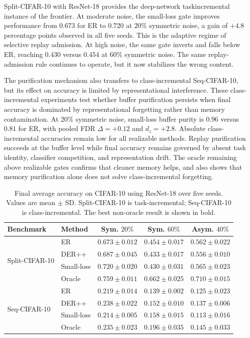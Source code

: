 \documentclass[preprint,12pt]{elsarticle}
\begin{document}
Split-CIFAR-10 with ResNet-18 provides the deep-network task\-in\-cre\-men\-tal instance of the frontier. At moderate noise, the small-loss gate improves performance from $0.673$ for ER to $0.720$ at $20\%$ symmetric noise, a gain of $+4.8$ percentage points observed in all five seeds. This is the adaptive regime of selective replay admission. At high noise, the same gate inverts and falls below ER, reaching $0.430$ versus $0.454$ at $60\%$ symmetric noise. The same replay-admission rule continues to operate, but it now stabilizes the wrong content.

The purification mechanism also transfers to class-incremental Seq-CIFAR-10, but its effect on accuracy is limited by representational interference. These class-incremental experiments test whether buffer purification persists when final accuracy is dominated by representational forgetting rather than memory contamination. At $20\%$ symmetric noise, small-loss buffer purity is $0.96$ versus $0.81$ for ER, with pooled FDR $\Delta=+0.12$ and $d_z=+2.8$. Absolute class-incremental accuracies remain low for all realizable methods. Replay purification succeeds at the buffer level while final accuracy remains governed by absent task identity, classifier competition, and representation drift. The oracle remaining above realizable gates confirms that cleaner memory helps, and also shows that memory purification alone does not solve class-incremental forgetting.

\enlargethispage{3\baselineskip}
\begin{table}[!htbp]
\centering
\caption{Final average accuracy on CIFAR-10 using ResNet-18 over five seeds. Values are mean $\pm$ SD. Split-CIFAR-10 is task-incremental; Seq-CIFAR-10 is class-incremental. The best non-oracle result is shown in bold.}
\label{tab:cifar}
\footnotesize
\setlength{\tabcolsep}{4pt} \renewcommand{\arraystretch}{0.94} \begin{tabular}{llccc}
\toprule
Benchmark & Method & Sym. $20\%$ & Sym. $60\%$ & Asym. $40\%$ \\
\midrule
\multirow{4}{*}{Split-CIFAR-10}
& ER         & $0.673\pm 0.012$ & $\mathbf{0.454\pm 0.017}$ & $0.562\pm 0.022$ \\
& DER++      & $0.687\pm 0.045$ & $0.433\pm 0.017$          & $0.556\pm 0.010$ \\
& Small-loss & $\mathbf{0.720\pm 0.020}$ & $0.430\pm 0.031$ & $\mathbf{0.565\pm 0.023}$ \\
& Oracle     & $0.759\pm 0.011$ & $0.662\pm 0.025$          & $0.710\pm 0.015$ \\
\midrule
\multirow{4}{*}{Seq-CIFAR-10}
& ER         & $0.219\pm 0.014$ & $0.139\pm 0.002$          & $0.125\pm 0.023$ \\
& DER++      & $\mathbf{0.238\pm 0.022}$ & $0.152\pm 0.010$ & $\mathbf{0.137\pm 0.006}$ \\
& Small-loss & $0.214\pm 0.005$ & $\mathbf{0.158\pm 0.015}$ & $0.113\pm 0.016$ \\
& Oracle     & $0.235\pm 0.023$ & $0.196\pm 0.035$          & $0.145\pm 0.033$ \\
\bottomrule
\end{tabular}
\end{table}
\FloatBarrier
\end{document}
